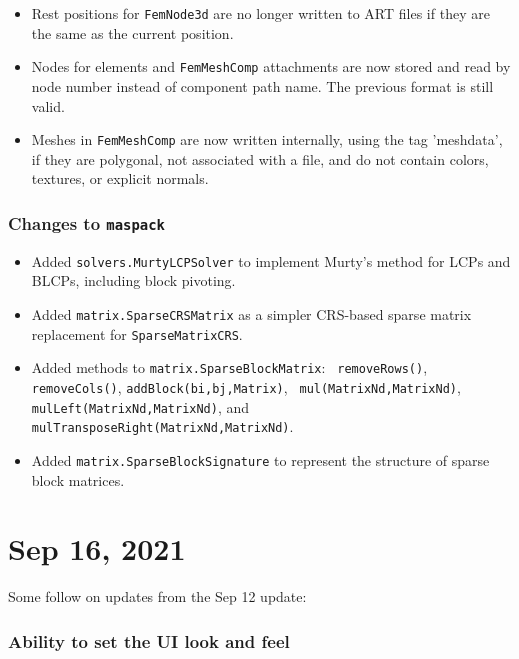 \documentclass{article}
\begin{document}
\begin{itemize}

\item Rest positions for {\tt FemNode3d} are no longer written to ART
files if they are the same as the current position.

\item Nodes for elements and {\tt FemMeshComp} attachments are now
stored and read by node number instead of component path name.
The previous format is still valid.

\item Meshes in {\tt FemMeshComp} are now written internally, using
the tag 'meshdata', if they are polygonal, not associated with a file,
and do not contain colors, textures, or explicit normals.

\end{itemize}

\subsubsection{Changes to {\tt maspack}}

\begin{itemize}

\item Added {\tt solvers.MurtyLCPSolver} to implement Murty's method
for LCPs and BLCPs, including block pivoting.

\item Added {\tt matrix.SparseCRSMatrix} as a simpler CRS-based sparse
matrix replacement for {\tt SparseMatrixCRS}.

\item Added methods to {\tt matrix.SparseBlockMatrix}: {\tt
removeRows()}, {\tt removeCols()}, {\tt addBlock(bi,bj,Matrix)}, {\tt
mul(MatrixNd,MatrixNd)}, {\tt mulLeft(MatrixNd,MatrixNd)},
and {\tt mulTransposeRight(MatrixNd,MatrixNd)}.

\item Added {\tt matrix.SparseBlockSignature} to represent the
structure of sparse block matrices.

\end{itemize}

\section*{Sep 16, 2021}

Some follow on updates from the Sep 12 update:

\subsubsection{Ability to set the UI look and feel}
\end{document}
